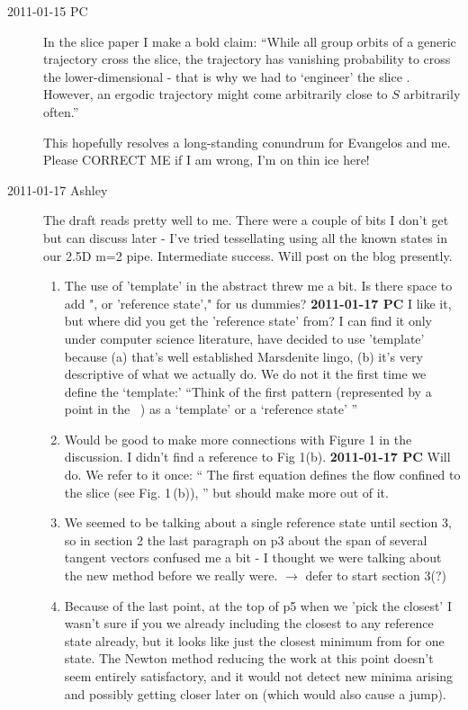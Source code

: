 \begin{description}
\item[2011-01-15 PC] In the slice paper I make a bold claim:
``While all group orbits of a  generic trajectory cross the slice, the
trajectory has vanishing probability to cross the lower-dimensional
{\sset} - that is why we had to `engineer' the slice .
However, an ergodic trajectory  might come arbitrarily close to  $S$
arbitrarily often.''

This hopefully resolves a long-standing conundrum for Evangelos and me.
Please CORRECT ME if I am wrong, I'm on thin ice here!

\item[2011-01-17 Ashley]
The draft reads pretty well to me.  There were a couple of bits I don't
get but can discuss later - I've tried tessellating using all the known
states in our 2.5D m=2 pipe.  Intermediate success.  Will post on the
blog presently.

\begin{enumerate}
  \item The use of 'template' in the abstract threw me a bit.  Is there
  space to add ", or 'reference state'," for us dummies?
  {\bf 2011-01-17 PC} I like it, but where did you get 
  the 'reference state' from? I  can find it only under computer science 
  literature, have decided to use 'template'  because (a) that's well 
  established Marsdenite lingo, (b) it's very descriptive of what we actually do. We do not it the
  first time we define the `template:'
  ``Think of the first pattern
(represented by a point {\slicep} in the \statesp\  \pS) as a
`template' or a
`reference state' ''

  \item Would be good to make more connections with Figure 1 in the
  discussion.  I didn't find a reference to Fig 1(b).
  {\bf 2011-01-17 PC} Will do. We refer to it once: ``
The first
equation defines the flow confined to the slice (see
Fig. 1\,(b)), '' but should make more out of it.

  \item We seemed to be talking about a single reference state until
  section 3, so in section 2 the last paragraph on p3 about the span of
  several tangent vectors confused me a bit - I thought we were talking
  about the new method before we really were. $\to$ defer to start section
  3(?)

  \item Because of the last point, at the top of p5 when we 'pick the
  closest' I wasn't sure if you we already including the closest to any
  reference state already, but it looks like just the closest minimum
  from for one state.  The Newton method reducing the work at this point
  doesn't seem entirely satisfactory, and it would not detect new minima
  arising and possibly getting closer later on (which would also cause a
  jump).


\end{enumerate}
\end{description}
